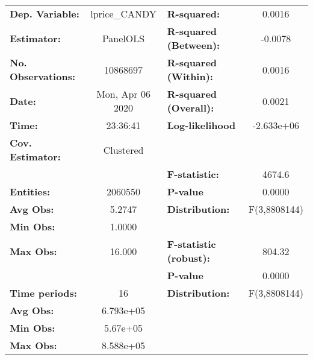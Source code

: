 \documentclass{report}
\begin{document}
\begin{center}
\begin{tabular}{lclc}
\toprule
\textbf{Dep. Variable:}       &   lprice\_CANDY    & \textbf{  R-squared:         }   &      0.0016      \\
\textbf{Estimator:}           &      PanelOLS      & \textbf{  R-squared (Between):}  &     -0.0078      \\
\textbf{No. Observations:}    &      10868697      & \textbf{  R-squared (Within):}   &      0.0016      \\
\textbf{Date:}                &  Mon, Apr 06 2020  & \textbf{  R-squared (Overall):}  &      0.0021      \\
\textbf{Time:}                &      23:36:41      & \textbf{  Log-likelihood     }   &    -2.633e+06    \\
\textbf{Cov. Estimator:}      &     Clustered      & \textbf{                     }   &                  \\
\textbf{}                     &                    & \textbf{  F-statistic:       }   &      4674.6      \\
\textbf{Entities:}            &      2060550       & \textbf{  P-value            }   &      0.0000      \\
\textbf{Avg Obs:}             &       5.2747       & \textbf{  Distribution:      }   &   F(3,8808144)   \\
\textbf{Min Obs:}             &       1.0000       & \textbf{                     }   &                  \\
\textbf{Max Obs:}             &       16.000       & \textbf{  F-statistic (robust):} &      804.32      \\
\textbf{}                     &                    & \textbf{  P-value            }   &      0.0000      \\
\textbf{Time periods:}        &         16         & \textbf{  Distribution:      }   &   F(3,8808144)   \\
\textbf{Avg Obs:}             &     6.793e+05      & \textbf{                     }   &                  \\
\textbf{Min Obs:}             &      5.67e+05      & \textbf{                     }   &                  \\
\textbf{Max Obs:}             &     8.588e+05      & \textbf{                     }   &                  \\
\bottomrule
\end{tabular}
\begin{tabular}{lcccccc}

\end{tabular}
\end{center}
\end{document}
